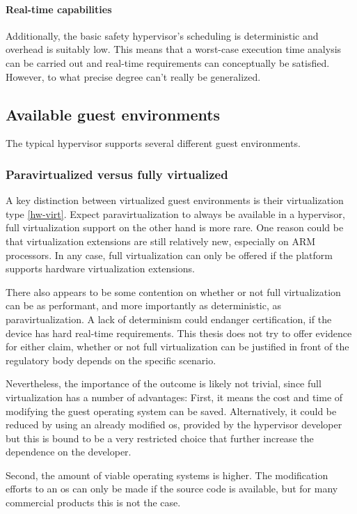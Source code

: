 \paragraph{Real-time capabilities}
Additionally, the basic safety hypervisor's scheduling is deterministic and overhead is suitably low. This means that a worst-case execution time analysis can be carried out and real-time requirements can conceptually be satisfied. However, to what precise degree can't really be generalized.


\subsection{Available guest environments}
The typical hypervisor supports several different guest environments.
\subsubsection{Paravirtualized versus fully virtualized}
A key distinction between virtualized guest environments is their virtualization type \ref{hw-virt}. Expect paravirtualization to always be available in a hypervisor, full virtualization support on the other hand is more rare. One reason could be that virtualization extensions are still relatively new, especially on ARM processors. In any case, full virtualization can only be offered if the platform supports hardware virtualization extensions.

There also appears to be some contention on whether or not full virtualization can be as performant, and more importantly as deterministic, as paravirtualization. A lack of determinism could endanger certification, if the device has hard real-time requirements. This thesis does not try to offer evidence for either claim, whether or not full virtualization can be justified in front of the regulatory body depends on the specific scenario. 

Nevertheless, the importance of the outcome is likely not trivial, since full virtualization has a number of advantages: First, it means the cost and time of modifying the guest operating system can be saved. Alternatively, it could be reduced by using an already modified \acrfull{os}, provided by the hypervisor developer but this is bound to be a very restricted choice that further increase the dependence on the developer.

Second, the amount of viable operating systems is higher. The modification efforts to an \acrshort{os} can only be made if the source code is available, but for many commercial products this is not the case. 

